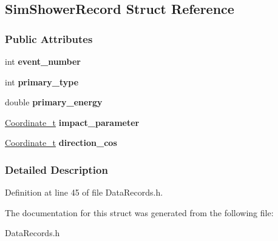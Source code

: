 \hypertarget{structSimShowerRecord}{
\subsection{SimShowerRecord Struct Reference}
\label{structSimShowerRecord}
}
\subsubsection*{Public Attributes}
\begin{DoxyCompactItemize}
\item 
\hypertarget{structSimShowerRecord_a2c6c16be74a12a7bd7e5476b715666ab}{
int {\bfseries event\_\-number}}
\label{structSimShowerRecord_a2c6c16be74a12a7bd7e5476b715666ab}

\item 
\hypertarget{structSimShowerRecord_a8fef1a45bc70f3bd2487efa43150eccd}{
int {\bfseries primary\_\-type}}
\label{structSimShowerRecord_a8fef1a45bc70f3bd2487efa43150eccd}

\item 
\hypertarget{structSimShowerRecord_aadaf1fab5a23b6a4cbed2fe5fa8ec5d8}{
double {\bfseries primary\_\-energy}}
\label{structSimShowerRecord_aadaf1fab5a23b6a4cbed2fe5fa8ec5d8}

\item 
\hypertarget{structSimShowerRecord_a2ead0ed3c8c4ea38c01d4e1dd85e4e14}{
\hyperlink{structCoordinate__t}{Coordinate\_\-t} {\bfseries impact\_\-parameter}}
\label{structSimShowerRecord_a2ead0ed3c8c4ea38c01d4e1dd85e4e14}

\item 
\hypertarget{structSimShowerRecord_a86d1bab066fd47e5fff2932137e9cf5b}{
\hyperlink{structCoordinate__t}{Coordinate\_\-t} {\bfseries direction\_\-cos}}
\label{structSimShowerRecord_a86d1bab066fd47e5fff2932137e9cf5b}

\end{DoxyCompactItemize}


\subsubsection{Detailed Description}


Definition at line 45 of file DataRecords.h.



The documentation for this struct was generated from the following file:\begin{DoxyCompactItemize}
\item 
DataRecords.h\end{DoxyCompactItemize}
